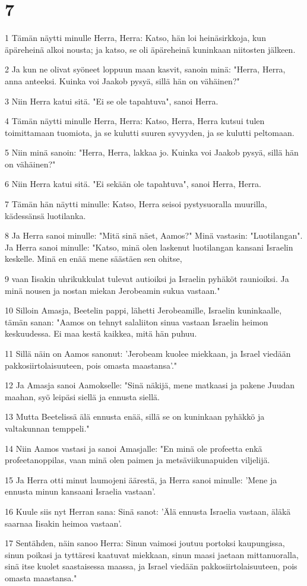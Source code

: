 \chapter{7}

\par 1 Tämän näytti minulle Herra, Herra: Katso, hän loi heinäsirkkoja, kun äpäreheinä alkoi nousta; ja katso, se oli äpäreheinä kuninkaan niitosten jälkeen.
\par 2 Ja kun ne olivat syöneet loppuun maan kasvit, sanoin minä: "Herra, Herra, anna anteeksi. Kuinka voi Jaakob pysyä, sillä hän on vähäinen?"
\par 3 Niin Herra katui sitä. "Ei se ole tapahtuva", sanoi Herra.
\par 4 Tämän näytti minulle Herra, Herra: Katso, Herra, Herra kutsui tulen toimittamaan tuomiota, ja se kulutti suuren syvyyden, ja se kulutti peltomaan.
\par 5 Niin minä sanoin: "Herra, Herra, lakkaa jo. Kuinka voi Jaakob pysyä, sillä hän on vähäinen?"
\par 6 Niin Herra katui sitä. "Ei sekään ole tapahtuva", sanoi Herra, Herra.
\par 7 Tämän hän näytti minulle: Katso, Herra seisoi pystysuoralla muurilla, kädessänsä luotilanka.
\par 8 Ja Herra sanoi minulle: "Mitä sinä näet, Aamos?" Minä vastasin: "Luotilangan". Ja Herra sanoi minulle: "Katso, minä olen laskenut luotilangan kansani Israelin keskelle. Minä en enää mene säästäen sen ohitse,
\par 9 vaan Iisakin uhrikukkulat tulevat autioiksi ja Israelin pyhäköt raunioiksi. Ja minä nousen ja nostan miekan Jerobeamin sukua vastaan."
\par 10 Silloin Amasja, Beetelin pappi, lähetti Jerobeamille, Israelin kuninkaalle, tämän sanan: "Aamos on tehnyt salaliiton sinua vastaan Israelin heimon keskuudessa. Ei maa kestä kaikkea, mitä hän puhuu.
\par 11 Sillä näin on Aamos sanonut: 'Jerobeam kuolee miekkaan, ja Israel viedään pakkosiirtolaisuuteen, pois omasta maastansa'."
\par 12 Ja Amasja sanoi Aamokselle: "Sinä näkijä, mene matkaasi ja pakene Juudan maahan, syö leipäsi siellä ja ennusta siellä.
\par 13 Mutta Beetelissä älä ennusta enää, sillä se on kuninkaan pyhäkkö ja valtakunnan temppeli."
\par 14 Niin Aamos vastasi ja sanoi Amasjalle: "En minä ole profeetta enkä profeetanoppilas, vaan minä olen paimen ja metsäviikunapuiden viljelijä.
\par 15 Ja Herra otti minut laumojeni äärestä, ja Herra sanoi minulle: 'Mene ja ennusta minun kansaani Israelia vastaan'.
\par 16 Kuule siis nyt Herran sana: Sinä sanot: 'Älä ennusta Israelia vastaan, äläkä saarnaa Iisakin heimoa vastaan'.
\par 17 Sentähden, näin sanoo Herra: Sinun vaimosi joutuu portoksi kaupungissa, sinun poikasi ja tyttäresi kaatuvat miekkaan, sinun maasi jaetaan mittanuoralla, sinä itse kuolet saastaisessa maassa, ja Israel viedään pakkosiirtolaisuuteen, pois omasta maastansa."

